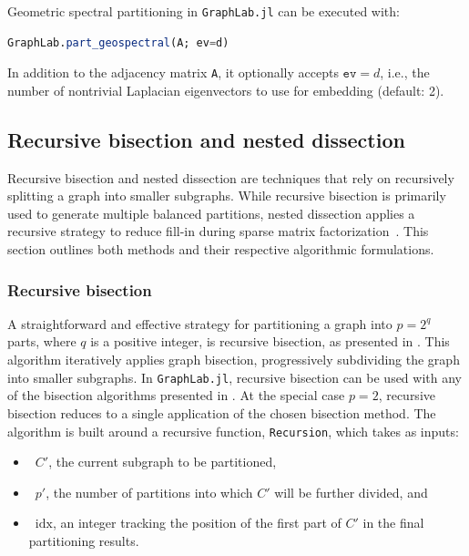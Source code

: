     Geometric spectral partitioning in \texttt{GraphLab.jl} can be executed with:

    \begin{lstlisting}[language=Julia]
    GraphLab.part_geospectral(A; ev=d)
    \end{lstlisting}

    In addition to the adjacency matrix \texttt{A}, it optionally accepts $\texttt{ev}=d$, i.e., the number of nontrivial Laplacian eigenvectors to use for embedding (default: 2).
    
    \subsection{Recursive bisection and nested dissection}
    Recursive bisection and nested dissection are techniques that rely on recursively splitting a graph into smaller subgraphs. While recursive bisection is primarily used to generate multiple balanced partitions, nested dissection applies a recursive strategy to reduce fill-in during sparse matrix factorization~\cite{George73}. This section outlines both methods and their respective algorithmic formulations.
    \subsubsection{Recursive bisection}
    \label{subsub:rec_bi}
    A straightforward and effective strategy for partitioning a graph into $p = 2^q$ parts,
    where $q$ is a positive integer, is recursive bisection, as presented in .
    This algorithm iteratively applies graph bisection, progressively
    subdividing the graph into smaller subgraphs.
    In \texttt{GraphLab.jl}, recursive bisection can be used with any of the bisection algorithms presented in .
    At the special case $p = 2$, recursive bisection reduces to a single application of the chosen bisection method.
    The algorithm is built around a recursive function, \texttt{Recursion}, which takes as inputs:
    \begin{itemize}
        \item~$C'$, the current subgraph to be partitioned,
        \item~$p'$, the number of partitions into which $C'$ will be further divided, and
        \item~$\mathrm{idx}$, an integer tracking the position of the first part of $C'$ in the final partitioning results.
    \end{itemize}
    

